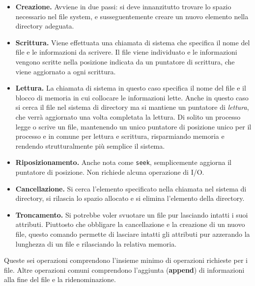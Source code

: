         \begin{itemize}
            \item \textbf{Creazione.} Avviene in due passi: si deve innanzitutto trovare lo spazio necessario nel file system, e susseguentemente creare un nuovo elemento nella directory adeguata.
            
            \item \textbf{Scrittura.} Viene effettuata una chiamata di sistema che specifica il nome del file e le informazioni da scrivere. Il file viene individuato e le informazioni vengono scritte nella posizione indicata da un puntatore di scrittura, che viene aggiornato a ogni scrittura.
            
            \item \textbf{Lettura.} La chiamata di sistema in questo caso specifica il nome del file e il blocco di memoria in cui collocare le informazioni lette. Anche in questo caso si cerca il file nel sistema di directory ma si mantiene un puntatore di \textit{lettura}, che verrà aggiornato una volta completata la lettura. Di solito un processo legge o scrive un file, mantenendo un unico puntatore di posizione unico per il processo e in comune per lettura e scrittura, risparmiando memoria e rendendo strutturalmente più semplice il sistema.
            
            \item \textbf{Riposizionamento.} Anche nota come \texttt{seek}, semplicemente aggiorna il puntatore di posizione. Non richiede alcuna operazione di I/O.
            
            \item \textbf{Cancellazione.} Si cerca l'elemento specificato nella chiamata nel sistema di directory, si rilascia lo spazio allocato e si elimina l'elemento della directory.
            
            \item \textbf{Troncamento.} Si potrebbe voler svuotare un file pur lasciando intatti i suoi attributi. Piuttosto che obbligare la cancellazione e la creazione di un nuovo file, questo comando permette di lasciare intatti gli attributi pur azzerando la lunghezza di un file e rilasciando la relativa memoria.
        \end{itemize}
        
        Queste sei operazioni comprendono l'insieme minimo di operazioni richieste per i file. Altre operazioni comuni comprendono l'aggiunta (\textbf{append}) di informazioni alla fine del file e la ridenominazione.
        
